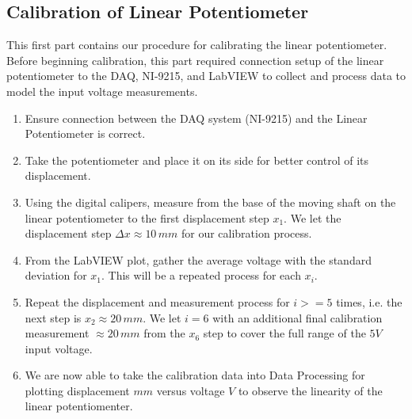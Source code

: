 \documentclass{article}
\begin{document}
\subsection{Calibration of Linear Potentiometer}
This first part contains our procedure for calibrating the linear potentiometer. Before beginning calibration, this part required connection setup of the linear potentiometer to the DAQ, NI-9215, and LabVIEW to collect and process data to model the input voltage measurements.

\begin{enumerate}
\item Ensure connection between the DAQ system (NI-9215) and the Linear Potentiometer is correct.
\vspace{2.5mm}

\item Take the potentiometer and place it on its side for better control of its displacement.
\vspace{2.5mm}

\item Using the digital calipers, measure from the base of the moving shaft on the linear potentiometer to the first displacement step $x_{1}$. We let the displacement step $\Delta x \approx 10\, mm$ for our calibration process. 
\vspace{2.5mm}

\item From the LabVIEW plot, gather the average voltage with the standard deviation for $x_{1}$. This will be a repeated process for each $x_{i}$.
\vspace{2.5mm}

\item Repeat the displacement and measurement process for $i>=5$ times, i.e. the next step is $x_{2} \approx 20\, mm$. We let $i = 6$ with an additional final calibration measurement $\approx 20\, mm$ from the $x_{6}$ step to cover the full range of the $5V$ input voltage.
\vspace{2.5mm}

\item We are now able to take the calibration data into Data Processing for plotting displacement $mm$ versus voltage $V$ to observe the linearity of the linear potentiomenter.

\end{enumerate}
\end{document}

